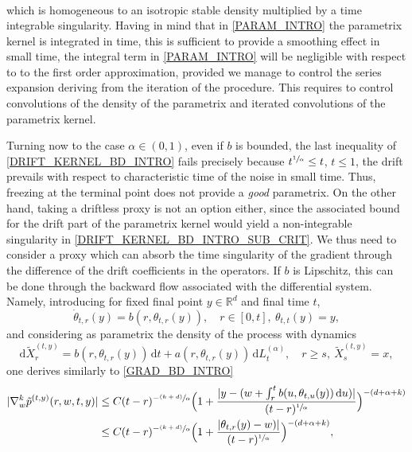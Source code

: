\documentclass[JEP,XML,SOM,Unicode,published]{cedram}
\newcommand{\psfrac}[2]{\sfrac{(#1)}{#2}}
\newcommand{\rd}{\mathrm{d}}
\theoremstyle{plain}
\theoremstyle{definition}
\newcommand\mR{\mathbb{R}}
\newcommand\1{{\mathbf{1}}}
\newcommand{\dif}{\,\mathrm{d}}
\begin{document}
{\begin{equation}
\begin{aligned}
\end{aligned}
\end{equation}
which is homogeneous to an isotropic stable density multiplied by a time integrable singularity.
Having in mind that in \eqref{PARAM_INTRO} the parametrix kernel is integrated in time,
this is sufficient to provide a smoothing effect in small time, \ie the integral term in \eqref{PARAM_INTRO} will be negligible with respect to to the first order approximation, provided we manage to control the series expansion deriving from the iteration of the procedure. This requires to control convolutions of the density of the parametrix and iterated convolutions of the parametrix kernel.}

{Turning now to the case $\alpha\in (0,1) $, even if $b$ is bounded, the last inequality of \eqref{DRIFT_KERNEL_BD_INTRO} fails precisely because $t^{\sfrac 1\alpha} \le t$, $t\le 1 $, \ie the drift prevails with respect to characteristic time of the noise in small time. Thus, freezing at the terminal point does not provide a \textit{good} parametrix. On the other hand, taking a driftless proxy is not an option either, since the associated bound for the drift part of the parametrix kernel would yield a non-integrable singularity in \eqref{DRIFT_KERNEL_BD_INTRO_SUB_CRIT}. We thus need to consider a proxy which can absorb the time singularity of the gradient through the difference of the drift coefficients in the operators. If $b$ is Lipschitz, this can \eg be done through the backward flow associated with the differential system. Namely,
introducing for fixed final point $y\in \mR^d$ and final time $t$,
\begin{equation}\label{DIFF_DYN}
\dot \theta_{t,r}(y)=b(r,\theta_{t,r}(y)),\quad r\in [0,t],\ \theta_{t,t}(y)=y,
\end{equation}
and considering as parametrix the density of the process with dynamics
\begin{equation}\label{PROXY_2}
\rd \tilde X_r^{(t,y)}=b(r,\theta_{t,r}(y))\dif t+a(r,\theta_{t,r}(y))\dif L^{(\alpha)}_t,\quad r\ge s,\ \tilde X_s^{(t,y)}=x,
\end{equation}
one derives similarly to \eqref{GRAD_BD_INTRO}
\begin{align*}%
|\nabla_w^k \tilde p^{(t,y)}(r,w,t,y)|&\le C (t-r)^{-\psfrac{k+d}\alpha}\Bigl(1+\frac{|y-(w+\int_r^t b(u,\theta_{t,u}(y))\dif u)|}{(t-r)^{\sfrac 1\alpha}}\Bigr)^{-(d+\alpha+k)}\\
&\le  C (t-r)^{-\psfrac{k+d}\alpha}\Bigl(1+\frac{|\theta_{t,r}(y)-w)|}{(t-r)^{\sfrac 1\alpha}}\Bigr)^{-(d+\alpha+k)},

\end{align*}}
\end{document}
